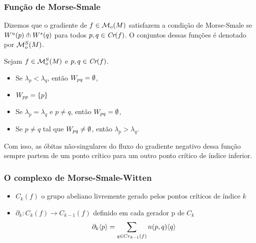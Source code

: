 \documentclass{beamer}
\begin{document}
\begin{footnotesize}
\begin{frame}
\begin{minipage}[t]{0.4\linewidth}
		\end{minipage}
	\end{frame}
	
	\begin{frame}
		\frametitle{Função de Morse-Smale}
		\begin{definicao}
			Dizemos que o gradiente de $f \in \mathcal{M}_{o}(M)$ satisfazem a condição de Morse-Smale se $W^{u}(p)\pitchfork W^{s}(q)$ para todos $p,q \in \textit{Cr}(f)$. O conjuntos dessas funções é denotado por $\mathcal{M}^{S}_{o}(M)$.
		\end{definicao}
			
		\begin{proposicao}
			Sejam $f \in \mathcal{M}^{S}_{o}(M)$ e $p,q \in \textit{Cr}(f)$.
			\begin{itemize}
				\item Se $\lambda_{p}<\lambda_{q}$, então $W_{pq} = \emptyset$,
				
				\item $W_{pp} = \{p\}$
				
				\item Se $\lambda_{p} = \lambda_{q}$ e $p\neq q$, então $W_{pq} = \emptyset$,
				
				\item Se $p \neq q$ tal que $W_{pq} \neq \emptyset$, então $\lambda_{p}>\lambda_{q}$.
			\end{itemize}
		\end{proposicao}
		
		Com isso, as óbitas não-singulares do fluxo do gradiente negativo dessa função sempre partem de um ponto crítico para um outro ponto crítico de índice inferior.

				
	\end{frame}
	
	\begin{frame}
		\frametitle{O complexo de Morse-Smale-Witten}
		\begin{definicao}
			\begin{itemize}
				\item $C_{k}(f)$ o grupo abeliano livremente gerado pelos pontos críticos de índice $k$ 
				
				\item 
				$\partial_{k}: C_{k}(f)\to C_{k-1}(f)$ definido em cada gerador p de $C_{k}$
				$$
				\partial_{k}\langle p\rangle=\sum_{q \in Cr_{k-1}(f)}n(p,q)\langle q\rangle
				$$
				

\end{itemize}
\end{definicao}
\end{frame}
\end{footnotesize}
\end{document}

